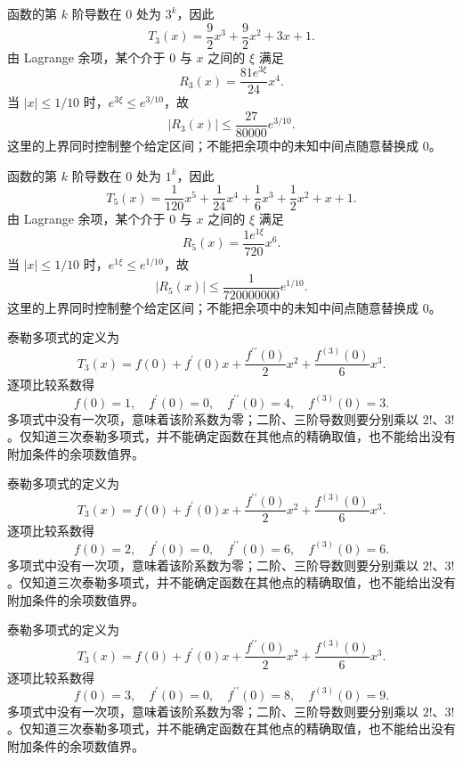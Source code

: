 \documentclass[12pt,fontset=fandol]{ctexart}
\begin{document}
\begin{solve}\label{ans:c10q18}
函数的第 $k$ 阶导数在 $0$ 处为 $3^k$，因此
\[
T_{3}(x)=\frac{9}{2}x^{3}+\frac{9}{2}x^{2}+3x+1.
\]
由 Lagrange 余项，某个介于 $0$ 与 $x$ 之间的 $\xi$ 满足
\[
R_{3}(x)=\frac{81e^{3\xi}}{24}x^{4}.
\]
当 $|x|\le1/10$ 时，$e^{3\xi}\le e^{3/10}$，故
\[
|R_{3}(x)|\le \frac{27}{80000}e^{3/10}.
\]
这里的上界同时控制整个给定区间；不能把余项中的未知中间点随意替换成 $0$。
\end{solve}

\begin{solve}\label{ans:c10q19}
函数的第 $k$ 阶导数在 $0$ 处为 $1^k$，因此
\[
T_{5}(x)=\frac{1}{120}x^{5}+\frac{1}{24}x^{4}+\frac{1}{6}x^{3}+\frac{1}{2}x^{2}+x+1.
\]
由 Lagrange 余项，某个介于 $0$ 与 $x$ 之间的 $\xi$ 满足
\[
R_{5}(x)=\frac{1e^{1\xi}}{720}x^{6}.
\]
当 $|x|\le1/10$ 时，$e^{1\xi}\le e^{1/10}$，故
\[
|R_{5}(x)|\le \frac{1}{720000000}e^{1/10}.
\]
这里的上界同时控制整个给定区间；不能把余项中的未知中间点随意替换成 $0$。
\end{solve}

\begin{solve}\label{ans:c10q20}
泰勒多项式的定义为
\[
T_3(x)=f(0)+f^{\prime}(0)x+\frac{f^{\prime\prime}(0)}2x^2+\frac{f^{(3)}(0)}6x^3.
\]
逐项比较系数得
\[
f(0)=1,\quad f^{\prime}(0)=0,\quad f^{\prime\prime}(0)=4,\quad f^{(3)}(0)=3.
\]
多项式中没有一次项，意味着该阶系数为零；二阶、三阶导数则要分别乘以 $2!$、$3!$。仅知道三次泰勒多项式，并不能确定函数在其他点的精确取值，也不能给出没有附加条件的余项数值界。
\end{solve}

\begin{solve}\label{ans:c10q21}
泰勒多项式的定义为
\[
T_3(x)=f(0)+f^{\prime}(0)x+\frac{f^{\prime\prime}(0)}2x^2+\frac{f^{(3)}(0)}6x^3.
\]
逐项比较系数得
\[
f(0)=2,\quad f^{\prime}(0)=0,\quad f^{\prime\prime}(0)=6,\quad f^{(3)}(0)=6.
\]
多项式中没有一次项，意味着该阶系数为零；二阶、三阶导数则要分别乘以 $2!$、$3!$。仅知道三次泰勒多项式，并不能确定函数在其他点的精确取值，也不能给出没有附加条件的余项数值界。
\end{solve}

\begin{solve}\label{ans:c10q22}
泰勒多项式的定义为
\[
T_3(x)=f(0)+f^{\prime}(0)x+\frac{f^{\prime\prime}(0)}2x^2+\frac{f^{(3)}(0)}6x^3.
\]
逐项比较系数得
\[
f(0)=3,\quad f^{\prime}(0)=0,\quad f^{\prime\prime}(0)=8,\quad f^{(3)}(0)=9.
\]
多项式中没有一次项，意味着该阶系数为零；二阶、三阶导数则要分别乘以 $2!$、$3!$。仅知道三次泰勒多项式，并不能确定函数在其他点的精确取值，也不能给出没有附加条件的余项数值界。
\end{solve}
\end{document}
